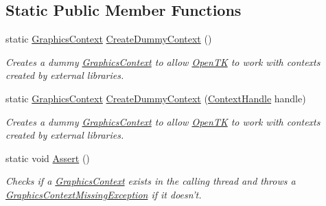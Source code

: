\subsection*{Static Public Member Functions}
\begin{DoxyCompactItemize}
\item 
static \hyperlink{class_open_t_k_1_1_graphics_1_1_graphics_context}{Graphics\-Context} \hyperlink{class_open_t_k_1_1_graphics_1_1_graphics_context_a5b6eadf39c00310bb0663d4eef883539}{Create\-Dummy\-Context} ()
\begin{DoxyCompactList}\small\item\em Creates a dummy \hyperlink{class_open_t_k_1_1_graphics_1_1_graphics_context}{Graphics\-Context} to allow \hyperlink{namespace_open_t_k}{Open\-T\-K} to work with contexts created by external libraries. \end{DoxyCompactList}\item 
static \hyperlink{class_open_t_k_1_1_graphics_1_1_graphics_context}{Graphics\-Context} \hyperlink{class_open_t_k_1_1_graphics_1_1_graphics_context_a36d9c29904cf9308b326da32b9d5cc8b}{Create\-Dummy\-Context} (\hyperlink{struct_open_t_k_1_1_context_handle}{Context\-Handle} handle)
\begin{DoxyCompactList}\small\item\em Creates a dummy \hyperlink{class_open_t_k_1_1_graphics_1_1_graphics_context}{Graphics\-Context} to allow \hyperlink{namespace_open_t_k}{Open\-T\-K} to work with contexts created by external libraries. \end{DoxyCompactList}\item 
static void \hyperlink{class_open_t_k_1_1_graphics_1_1_graphics_context_ae30eee17232c683f9c6151dfff6d804c}{Assert} ()
\begin{DoxyCompactList}\small\item\em Checks if a \hyperlink{class_open_t_k_1_1_graphics_1_1_graphics_context}{Graphics\-Context} exists in the calling thread and throws a \hyperlink{class_open_t_k_1_1_graphics_1_1_graphics_context_missing_exception}{Graphics\-Context\-Missing\-Exception} if it doesn't. \end{DoxyCompactList}\end{DoxyCompactItemize}
